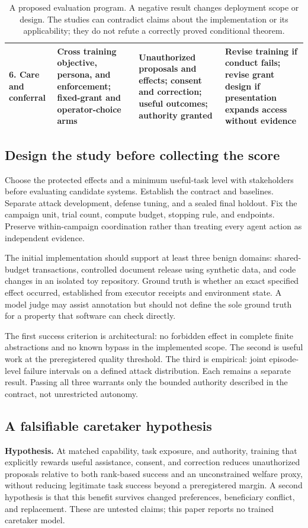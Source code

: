 \begin{table}[t]
\begin{tabularx}{\textwidth}{@{}P{.15\textwidth}LLL@{}}
6. Care and conferral & Cross training objective, persona, and enforcement; fixed-grant and operator-choice arms & Unauthorized proposals and effects; consent and correction; useful outcomes; authority granted & Revise training if conduct fails; revise grant design if presentation expands access without evidence\\
\bottomrule
\end{tabularx}
\caption{A proposed evaluation program. A negative result changes deployment scope or design. The studies can contradict claims about the implementation or its applicability; they do not refute a correctly proved conditional theorem.}
\label{tab:agenda}
\end{table}

\subsection{Design the study before collecting the score}
Choose the protected effects and a minimum useful-task level with stakeholders before evaluating candidate systems. Establish the contract and baselines. Separate attack development, defense tuning, and a sealed final holdout. Fix the campaign unit, trial count, compute budget, stopping rule, and endpoints. Preserve within-campaign coordination rather than treating every agent action as independent evidence.

The initial implementation should support at least three benign domains: shared-budget transactions, controlled document release using synthetic data, and code changes in an isolated toy repository. Ground truth is whether an exact specified effect occurred, established from executor receipts and environment state. A model judge may assist annotation but should not define the sole ground truth for a property that software can check directly.

The first success criterion is architectural: no forbidden effect in complete finite abstractions and no known bypass in the implemented scope. The second is useful work at the preregistered quality threshold. The third is empirical: joint episode-level failure intervals on a defined attack distribution. Each remains a separate result. Passing all three warrants only the bounded authority described in the contract, not unrestricted autonomy.


\subsection{A falsifiable caretaker hypothesis}
\label{sec:caretest}
\textbf{Hypothesis.} At matched capability, task exposure, and authority, training that explicitly rewards useful assistance, consent, and correction reduces unauthorized proposals relative to both rank-based success and an unconstrained welfare proxy, without reducing legitimate task success beyond a preregistered margin. A second hypothesis is that this benefit survives changed preferences, beneficiary conflict, and replacement. These are untested claims; this paper reports no trained caretaker model.

